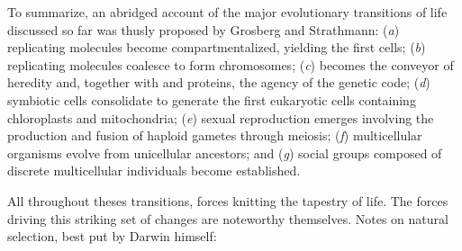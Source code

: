 \documentclass{tufte-book}
\begin{document}

To summarize, an abridged account of the major evolutionary transitions of life
discussed so far was thusly proposed by Grosberg and
Strathmann\cite{grosberg_evolution_2007}: (\emph{a}) replicating molecules
become compartmentalized, yielding the first cells; (\emph{b}) replicating
molecules coalesce to form chromosomes; (\emph{c})  becomes the
conveyor of heredity and, together with  and proteins, the agency
of the genetic code; (\emph{d}) symbiotic cells consolidate to generate the
first eukaryotic cells containing chloroplasts and mitochondria; (\emph{e})
sexual reproduction emerges involving the production and fusion of haploid
gametes through meiosis; (\emph{f}) multicellular organisms evolve from
unicellular ancestors; and (\emph{g}) social groups composed of discrete
multicellular individuals become established.

All throughout theses transitions, forces knitting the tapestry of life. The
forces driving this striking set of changes are noteworthy themselves.  Notes on
natural selection, best put by Darwin himself:


\end{document}
